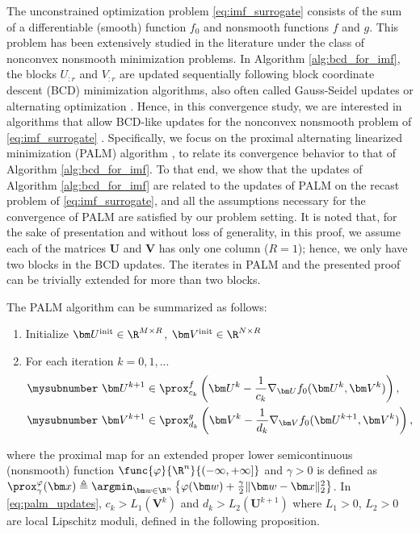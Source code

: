 The unconstrained optimization problem \eqref{eq:imf_surrogate} consists of the sum of a differentiable (smooth) function $f_0$ and nonsmooth functions $f$ and $g$. This problem has been extensively studied in the literature under the class of nonconvex nonsmooth minimization problems.
In Algorithm \ref{alg:bcd_for_imf}, the blocks $U_{:r}$ and $V_{:r}$ are updated sequentially following block coordinate descent (BCD) minimization algorithms, also often called Gauss-Seidel updates or alternating optimization \cite{nesterov2012efficiency,attouch2013convergence}.
Hence, in this convergence study, we are interested in algorithms that allow BCD-like updates for the nonconvex nonsmooth problem of \eqref{eq:imf_surrogate} \cite{beck2013convergence,bolte2014proximal}. Specifically, we focus on the proximal alternating linearized minimization (PALM) algorithm \cite{bolte2014proximal}, to relate its convergence behavior to that of Algorithm \ref{alg:bcd_for_imf}.
To that end, we show that the updates of Algorithm \ref{alg:bcd_for_imf} are related to the updates of PALM on the recast problem of \eqref{eq:imf_surrogate}, and all the assumptions necessary for the convergence of PALM are satisfied by our problem setting.
It is noted that, for the sake of presentation and without loss of generality, in this proof, we assume each of the matrices $\bm U$ and $\bm V$ has only one column ($R=1$); hence, we only have two blocks in the BCD updates. The iterates in PALM and the presented proof can be trivially extended for more than two blocks.

The PALM algorithm can be summarized as follows:
\begin{enumerate}
    \item Initialize $\bm U^{\rm init} \in \R^{M\times R}$, $\bm V^{\rm init} \in \R^{N\times R}$
    \item For each iteration $k=0,1,...$
          \begin{align}
              \begin{split}
                  \mysubnumber~ \bm U^{k+1} & \in \prox^f_{c_k} \left(\bm U^k - \frac{1}{c_k} \nabla_{\bm U} f_0(\bm U^k, \bm V^k)\right),     \\
                  \mysubnumber~ \bm V^{k+1} & \in \prox^g_{d_k} \left(\bm V^k - \frac{1}{d_k} \nabla_{\bm V} f_0(\bm U^{k+1}, \bm V^k)\right),
              \end{split}
              \label{eq:palm_updates}
          \end{align}
\end{enumerate}
where the proximal map for an extended proper lower semicontinuous (nonsmooth) function $\func{\varphi}{\R^n}{(-\infty,+\infty]}$ and $\gamma > 0$ is defined as $\prox^\varphi_\gamma(\bm x) \triangleq \argmin_{\bm w\in\R^n}\left\{\varphi(\bm w) + \frac{\gamma}{2} \|\bm w - \bm x\|^2_2\right\}$. In \eqref{eq:palm_updates}, $c_k > L_1(\bm V^k)$ and $d_k > L_2(\bm U^{k+1})$ where $L_1 > 0$, $L_2 > 0$ are local Lipschitz moduli, defined in the following proposition.

